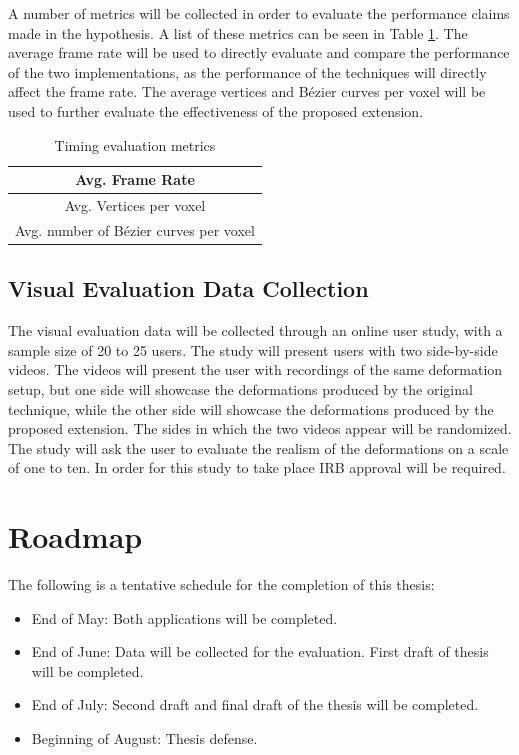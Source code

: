 A number of metrics will be collected in order to evaluate the performance claims made in the
hypothesis. A list of these metrics can be 
seen in Table \ref{tab:TimingEvaluationMetrics}. The average frame rate will be 
used to directly evaluate and compare the performance of the two implementations, as the 
performance of the techniques will directly affect the frame rate. The average vertices and Bézier 
curves per voxel will be used to further evaluate the effectiveness of the proposed extension.

\begin{table}
  \begin{center}
    \begin{tabular}{|c|} 
      \hline
      Avg. Frame Rate  \\ 
      \hline
      Avg. Vertices per voxel   \\
      \hline
      Avg. number of Bézier curves per voxel \\
      \hline
    \end{tabular}
  \end{center}
  
  \caption{Timing evaluation metrics}\label{tab:TimingEvaluationMetrics}
\end{table}


\subsection{Visual Evaluation Data Collection}

The visual evaluation data will be collected through an online user study, with a sample size of
20 to 25 users. The study will present users with two side-by-side videos. The videos will present 
the user with recordings of the same deformation setup, but one side will showcase the deformations 
produced by the original technique, while the other side will showcase the deformations produced by 
the proposed extension. The sides in which the two videos appear will be randomized. The study will 
ask the user to evaluate the realism of the deformations on a scale of one to ten. In order for this
study to take place IRB approval will be required.

\section{Roadmap}
The following is a tentative schedule for the completion of this thesis:
\begin{itemize}
  \item End of May: Both applications will be completed.
  \item End of June: Data will be collected for the evaluation. First draft of thesis will be 
  completed.
  \item End of July: Second draft and final draft of the thesis will be completed.
  \item Beginning of August: Thesis defense.
\end{itemize}

